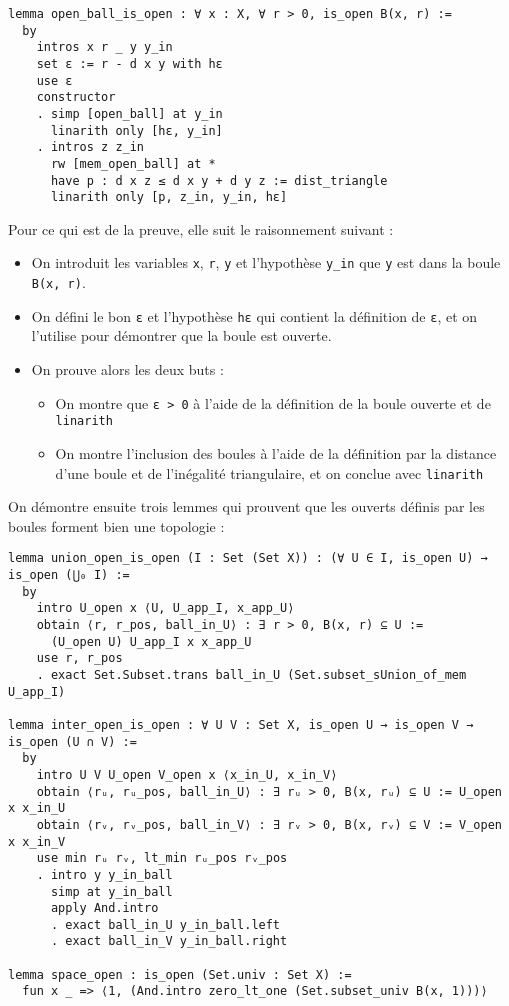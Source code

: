 \documentclass[a4paper, 12pt]{article}
\newcommand{\lean}[1]{\texttt{#1}}
\begin{document}
\begin{verbatim}
lemma open_ball_is_open : ∀ x : X, ∀ r > 0, is_open B(x, r) :=
  by
    intros x r _ y y_in
    set ε := r - d x y with hε
    use ε
    constructor
    . simp [open_ball] at y_in
      linarith only [hε, y_in]
    . intros z z_in
      rw [mem_open_ball] at *
      have p : d x z ≤ d x y + d y z := dist_triangle
      linarith only [p, z_in, y_in, hε]
\end{verbatim}

Pour ce qui est de la preuve, elle suit le raisonnement suivant :

\begin{itemize}
    \item On introduit les variables \lean{x}, \lean{r}, \lean{y} et l'hypothèse \lean{y_in} que \lean{y} est dans la boule \lean{B(x, r)}.
    \item On défini le bon \lean{ε} et l'hypothèse \lean{hε} qui contient la définition de \lean{ε}, et on l'utilise pour démontrer que la boule est ouverte.
    \item On prouve alors les deux buts :
        \begin{itemize}
            \item On montre que \lean{ε > 0} à l'aide de la définition de la boule ouverte et de \lean{linarith}
            \item On montre l'inclusion des boules à l'aide de la définition par la distance d'une boule et de l'inégalité triangulaire, et on conclue avec \lean{linarith}
        \end{itemize}
\end{itemize}

On démontre ensuite trois lemmes qui prouvent que les ouverts définis par les boules forment bien une topologie :

\begin{verbatim}
lemma union_open_is_open (I : Set (Set X)) : (∀ U ∈ I, is_open U) → is_open (⋃₀ I) :=
  by
    intro U_open x ⟨U, U_app_I, x_app_U⟩
    obtain ⟨r, r_pos, ball_in_U⟩ : ∃ r > 0, B(x, r) ⊆ U :=
      (U_open U) U_app_I x x_app_U
    use r, r_pos
    . exact Set.Subset.trans ball_in_U (Set.subset_sUnion_of_mem U_app_I)

lemma inter_open_is_open : ∀ U V : Set X, is_open U → is_open V → is_open (U ∩ V) :=
  by
    intro U V U_open V_open x ⟨x_in_U, x_in_V⟩
    obtain ⟨rᵤ, rᵤ_pos, ball_in_U⟩ : ∃ rᵤ > 0, B(x, rᵤ) ⊆ U := U_open x x_in_U
    obtain ⟨rᵥ, rᵥ_pos, ball_in_V⟩ : ∃ rᵥ > 0, B(x, rᵥ) ⊆ V := V_open x x_in_V
    use min rᵤ rᵥ, lt_min rᵤ_pos rᵥ_pos
    . intro y y_in_ball
      simp at y_in_ball
      apply And.intro
      . exact ball_in_U y_in_ball.left
      . exact ball_in_V y_in_ball.right

lemma space_open : is_open (Set.univ : Set X) :=
  fun x _ => ⟨1, (And.intro zero_lt_one (Set.subset_univ B(x, 1)))⟩
\end{verbatim}
\end{document}
